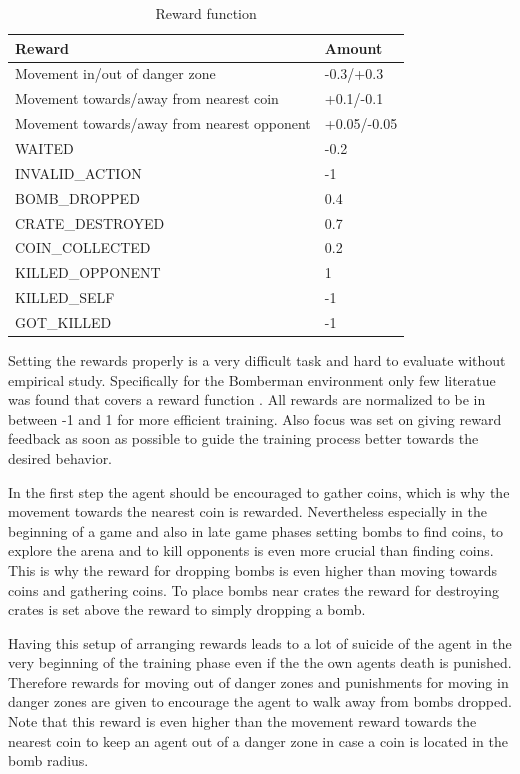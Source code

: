 \begin{table}[hbt!]
	\caption{Reward function}
	\label{tab:rewards}
	\begin{tabular}{|p{}|p{}|}
		\hline
		\textbf{Reward} & \textbf{Amount} \\ \hline
		Movement in/out of danger zone & -0.3/+0.3 \\ \hline
		Movement towards/away from nearest coin & +0.1/-0.1 \\ \hline
		Movement towards/away from nearest opponent & +0.05/-0.05 \\ \hline
		WAITED & -0.2 \\ \hline
		INVALID\_ACTION & -1 \\ \hline
		BOMB\_DROPPED & 0.4 \\ \hline
		CRATE\_DESTROYED & 0.7 \\ \hline
		COIN\_COLLECTED & 0.2 \\ \hline
		KILLED\_OPPONENT & 1 \\ \hline
		KILLED\_SELF & -1 \\ \hline
		GOT\_KILLED & -1 \\ \hline
	\end{tabular}
\end{table}

Setting the rewards properly is a very difficult task and hard to evaluate without empirical study. Specifically for the Bomberman environment only few literatue was found that covers a reward function \cite{Kormelink2018, Franca2019}. All rewards are normalized to be in between -1 and 1 for more efficient training. Also focus was set on giving reward feedback as soon as possible to guide the training process better towards the desired behavior. 

In the first step the agent should be encouraged to gather coins, which is why the movement towards the nearest coin is rewarded. Nevertheless especially in the beginning of a game and also in late game phases setting bombs to find coins, to explore the arena and to kill opponents is even more crucial than finding coins. This is why the reward for dropping bombs is even higher than moving towards coins and gathering coins. To place bombs near crates the reward for destroying crates is set above the reward to simply dropping a bomb. 

Having this setup of arranging rewards leads to a lot of suicide of the agent in the very beginning of the training phase even if the the own agents death is punished. Therefore rewards for moving out of danger zones and punishments for moving in danger zones are given to encourage the agent to walk away from bombs dropped. Note that this reward is even higher than the movement reward towards the nearest coin to keep an agent out of a danger zone in case a coin is located in the bomb radius. 

